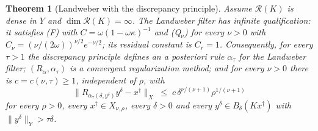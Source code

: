 \documentclass[a4paper]{report}
\theoremstyle{plain}
\newtheorem{theorem}{Theorem}[chapter]
\theoremstyle{definition}
\theoremstyle{remark}
\newcommand{\Ran}{\mathcal{R}}
\newcommand{\dg}{^{\dagger}}
\begin{document}
\begin{theorem}[Landweber with the discrepancy principle]
  \label{thm_landweber_order_optimal}
  Assume $\Ran(K)$ is dense in $Y$ and $\dim\Ran(K) = \infty$.  The Landweber filter has
  infinite qualification: it satisfies (F) with $C = \omega(1-\omega\kappa)^{-1}$ and
  (Q$_{\nu}$) for every $\nu > 0$ with $C_{\nu} = (\nu/(2\omega))^{\nu/2}e^{-\nu/2}$; its
  residual constant is $C_r = 1$.  Consequently, for every $\tau > 1$ the discrepancy
  principle defines an a posteriori rule $\alpha_{\tau}$ for the Landweber filter;
  $(R_{\alpha},\alpha_{\tau})$ is a convergent regularization method; and for every
  $\nu > 0$ there is $c = c(\nu,\tau) \ge 1$, independent of $\rho$, with
  \[
    \bigl\|R_{\alpha_{\tau}(\delta,y^{\delta})}y^{\delta} - x\dg\bigr\|_X
      \;\le\; c\,\delta^{\nu/(\nu+1)}\rho^{1/(\nu+1)}
  \]
  for every $\rho > 0$, every $x\dg \in X_{\nu,\rho}$, every $\delta > 0$ and every
  $y^{\delta} \in B_{\delta}(Kx\dg)$ \emph{with} $\|y^{\delta}\|_Y > \tau\delta$.
\end{theorem}
\end{document}
